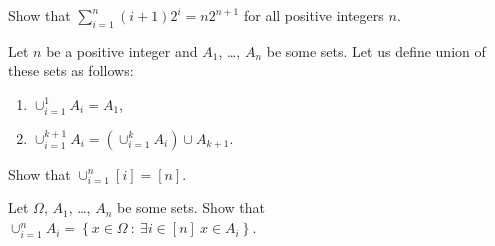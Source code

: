 \documentclass[addpoints]{exam}
\begin{document}
  \pagestyle{headandfoot}
  \runningheadrule

  \firstpagefooter{}{}{}
  \runningfooter{}{}{}
  \begin{flushright}

    \vspace{0.2in}
  \end{flushright}

  \begin{questions}
    \question
      Show that $\sum_{i = 1}^n (i + 1) 2^i = n 2^{n + 1}$ for all positive integers
			$n$.

      \begin{solution}[\stretch{1}]
      \end{solution}
      \newpage
    \question
      Let $n$ be a positive integer and $A_1$, \dots, $A_n$ be some sets.
			Let us define union of these sets as follows:
			\begin{enumerate}
			    \item $\cup_{i = 1}^1 A_i = A_1$,
			    \item $\cup_{i = 1}^{k + 1} A_i =
			        (\cup_{i = 1}^{k} A_i) \cup A_{k + 1}$.
			\end{enumerate}
			
			Show that $\cup_{i = 1}^n [i] = [n]$.

      \begin{solution}[\stretch{1}]
      \end{solution}
      \newpage
    \question
      Let $\Omega$, $A_1$, \dots, $A_n$ be some sets.
			Show that
			$\cup_{i = 1}^n A_i =
			    \left\{x \in \Omega ~:~ \exists i \in [n] \  x \in A_i \right\}$.

      \begin{solution}[\stretch{1}]
      \end{solution}
      \newpage
  \end{questions}
\end{document}
